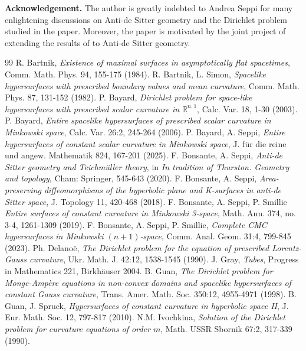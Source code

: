 \documentclass[10pt,reqno,oneside]{amsart}
\theoremstyle{definition}
\theoremstyle{remark}
\newcommand{\R}{\mathbb{R}}
\begin{document}
\noindent\textbf{Acknowledgement.} The author is greatly indebted to Andrea Seppi for many enlightening discussions on Anti-de Sitter geometry and the Dirichlet problem studied in the paper. Moreover, the paper is motivated by the joint project of extending the results of \cite{BS} to Anti-de Sitter geometry.
\begin{thebibliography}{99}
 R. Bartnik, \textit{Existence of maximal surfaces in asymptotically flat spacetimes}, Comm. Math. Phys. 94, 155-175 (1984).
 R. Bartnik, L. Simon, \textit{Spacelike hypersurfaces with prescribed boundary values and mean curvature}, Comm. Math. Phys. 87, 131-152 (1982).
 P. Bayard, \textit{Dirichlet problem for space-like hypersurfaces with prescribed scalar curvature in $\R^{n,1}$}, Calc. Var. 18, 1-30 (2003).
 P. Bayard, \textit{Entire spacelike hypersurfaces of prescribed scalar curvature in Minkowski space}, Calc. Var. 26:2, 245-264 (2006).
 P. Bayard, A. Seppi, \textit{Entire hypersurfaces of constant scalar curvature in Minkowski space}, J. f\"ur die reine und angew. Mathematik 824, 167-201 (2025).%
 F. Bonsante, A. Seppi, \textit{Anti-de Sitter geometry and Teichm\"uller theory}, in \textit{In tradition of Thurston. Geometry and topology}, Cham: Springer, 545-643 (2020).
 F. Bonsante, A. Seppi, \textit{Area-preserving diffeomorphisms of the hyperbolic plane and K-surfaces in anti-de Sitter space}, J. Topology 11, 420-468 (2018).
 F. Bonsante, A. Seppi, P. Smillie \textit{Entire surfaces of constant curvature in Minkowski 3-space}, Math. Ann. 374, no. 3-4, 1261-1309 (2019).
 F. Bonsante, A. Seppi, P. Smillie, \textit{Complete CMC hypersurfaces in Minkowski $(n+1)$-space}, Comm. Anal. Geom. 31:4, 799-845 (2023).
 Ph. Delano\"e, \textit{The Dirichlet problem for the equation of prescribed Lorentz-Gauss curvature}, Ukr. Math. J. 42:12, 1538-1545 (1990).
 J. Gray, \textit{Tubes}, Progress in Mathematics 221, Birkh\"auser 2004.
 B. Guan, \textit{The Dirichlet problem for Monge-Amp\`ere equations in non-convex domains and spacelike hypersurfaces of constant Gauss curvature}, Trans. Amer. Math. Soc. 350:12, 4955-4971 (1998).
 B. Guan, J. Spruck, \textit{Hypersurfaces of constant curvature in hyperbolic space II}, J. Eur. Math. Soc. 12, 797-817 (2010).
 N.M. Ivochkina, \textit{Solution of the Dirichlet problem for curvature equations of order $m$}, Math. USSR Sbornik 67:2, 317-339 (1990).

\end{thebibliography}
\end{document}
